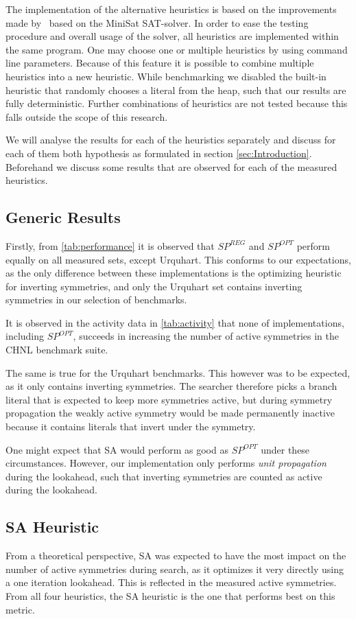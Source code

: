 The implementation of the alternative heuristics is based on the improvements
made by~\cite{devriendt2012symmetry} based on the MiniSat SAT-solver.
In order to ease the testing procedure and overall usage of the solver, all heuristics
are implemented within the same program. One may choose one or multiple heuristics
by using command line parameters. Because of this feature it is possible to combine
multiple heuristics into a new heuristic.
While benchmarking we disabled the built-in heuristic that randomly chooses a literal from the heap,
such that our results are fully deterministic.
Further combinations of heuristics are not tested because this falls outside the scope
of this research.

We will analyse the results for each of the heuristics separately and discuss for each of them both
hypothesis as formulated in section \ref{sec:Introduction}.
Beforehand we discuss some results that are observed for each of the measured heuristics.

\subsection{Generic Results}
	Firstly, from \cref{tab:performance} it is observed that $SP^{REG}$ and $SP^{OPT}$ perform equally on all measured sets,
	except Urquhart.
	This conforms to our expectations, as the only difference between these implementations is the
	optimizing heuristic for inverting symmetries, and only the Urquhart set contains inverting
	symmetries in our selection of benchmarks.

	It is observed in the activity data in \cref{tab:activity} that none of implementations, including $SP^{OPT}$,
	succeeds in increasing the number of active symmetries in the CHNL benchmark suite.

	The same is true for the Urquhart benchmarks.
	This however was to be expected, as it only contains inverting symmetries.
	The searcher therefore picks a branch literal that is expected to keep more symmetries active,
	but during symmetry propagation the weakly active symmetry would be made permanently inactive
	because it contains literals that invert under the symmetry.

	One might expect that SA would perform as good as $SP^{OPT}$ under these circumstances.
	However, our implementation only performs \emph{unit propagation} during the lookahead, such
	that inverting symmetries are counted as active during the lookahead.

\subsection{SA Heuristic}
	From a theoretical perspective, SA was expected to have the most impact on the number of active
	symmetries during search, as it optimizes it very directly using a one iteration lookahead.
	This is reflected in the measured active symmetries.
	From all four heuristics, the SA heuristic is the one that performs best on this metric.

